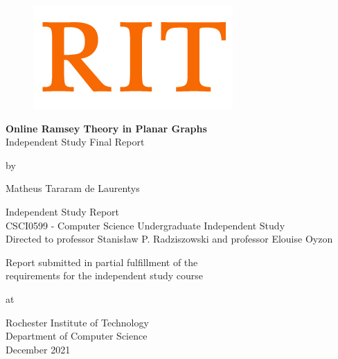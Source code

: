 \begin{titlepage}
\begin{figure}[H]
    \hspace*{-1.0cm}
    \vspace*{-0.5cm}
    \includegraphics[scale=1]{images/logo_rit.jpg}\\
\end{figure}

\begin{center}
    \vspace*{2cm}
    
    {\LARGE \textbf{Online Ramsey Theory in Planar Graphs} \\ Independent Study Final Report}
        
	\vspace{1cm}
	 by
    \vspace{1cm}
    
   Matheus Tararam de Laurentys
\end{center}

\vspace{1cm}

\begin{center}   
	{\large Independent Study Report \\ 
		CSCI0599 - Computer Science Undergraduate Independent Study} \\
	\vspace{0.5cm}
	Directed to professor Stanis\l{}aw P. Radziszowski and professor Elouise Oyzon\\
	
\end{center}

\vspace{1cm}

\begin{center}
	Report submitted in partial fulfillment of the\\
	requirements for the independent study course

	\vspace{1.0cm}
	at
	\vspace{1cm}
	
	Rochester Institute of Technology \\
	Department of Computer Science \\
	December 2021
\end{center}

\end{titlepage}